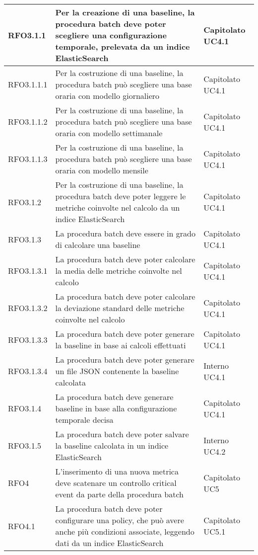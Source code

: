 \begin{center}
\begin{longtable}{ | >{\centering\arraybackslash}m{2.5cm} | >{\centering\arraybackslash}m{8cm} | >{\centering\arraybackslash}m{2.5cm} | }
       	RFO3.1.1 & Per la creazione di una baseline, la procedura batch deve poter scegliere una configurazione temporale, prelevata da un indice ElasticSearch & Capitolato UC4.1\\ \hline
       	RFO3.1.1.1 & Per la costruzione di una baseline, la procedura batch può scegliere una base oraria con modello giornaliero & Capitolato UC4.1\\ \hline
       	RFO3.1.1.2 & Per la costruzione di una baseline, la procedura batch può scegliere una base oraria con modello settimanale & Capitolato UC4.1 \\ \hline
       	RFO3.1.1.3 & Per la costruzione di una baseline, la procedura batch può scegliere una base oraria con modello mensile & Capitolato UC4.1 \\ \hline
       	RFO3.1.2 & Per la costruzione di una baseline, la procedura batch deve poter leggere le metriche coinvolte nel calcolo da un indice ElasticSearch & Capitolato UC4.1 \\ \hline
       	RFO3.1.3 & La procedura batch deve essere in grado di calcolare una baseline & Capitolato UC4.1\\ \hline
       	RFO3.1.3.1 & La procedura batch deve poter calcolare la media delle metriche coinvolte nel calcolo & Capitolato UC4.1\\ \hline
       	RFO3.1.3.2 & La procedura batch deve poter calcolare la deviazione standard delle metriche coinvolte nel calcolo & Capitolato UC4.1\\ \hline
       	RFO3.1.3.3 & La procedura batch deve poter generare la baseline in base ai calcoli effettuati & Capitolato UC4.1\\ \hline
       	RFO3.1.3.4 & La procedura batch deve poter generare un file JSON contenente la baseline calcolata & Interno UC4.1\\ \hline
        RFO3.1.4 & La procedura batch deve generare baseline in base alla configurazione temporale decisa & Capitolato UC4.1\\ \hline
        RFO3.1.5 & La procedura batch deve poter salvare la baseline calcolata in un indice ElasticSearch & Interno UC4.2\\ \hline
       	RFO4 & L'inserimento di una nuova metrica deve scatenare un controllo critical event da parte della procedura batch & Capitolato UC5\\ \hline
       	RFO4.1 & La procedura batch deve poter configurare una policy, che può avere anche più condizioni associate, leggendo dati da un indice ElasticSearch & Capitolato UC5.1\\ \hline

\end{longtable}
\end{center}
